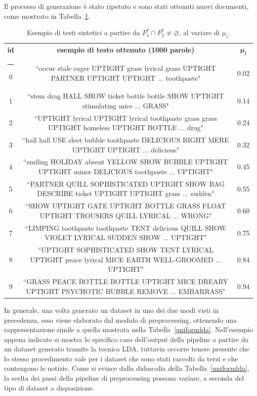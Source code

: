 \documentclass[12pt]{report}
\makeatletter
\theoremstyle{definition}
\newcommand{\thickhline}{%
    \noalign {\ifnum 0=`}\fi \hrule height 1pt
    \futurelet \reserved@a \@xhline
}
\let\emptyset\varnothing
\makeatother
\begin{document}
Il processo di generazione è stato ripetuto e sono stati ottenuti nuovi documenti, come mostrato in Tabella~\ref{generationexample2}.
\begin{table}
\centering
\begin{adjustbox}{max width=\textwidth}
 \begin{tabular}{|c|c|c|} 
 \hline
\textbf{id} & \textbf{esempio di testo ottenuto (1000 parole)} & $\bm{\mu_i}$ 
\\ [0.5ex] 
 \thickhline
0 & ``occur stale eager UPTIGHT grass lyrical grass UPTIGHT PARTNER UPTIGHT UPTIGHT ... toothpaste" & 0.02 \\
1 & ``stem drag HALL SHOW ticket bottle bottle SHOW UPTIGHT stimulating mice ... GRASS" & 0.14  \\
2 & ``UPTIGHT lyrical UPTIGHT lyrical toothpaste grass grass UPTIGHT homeless UPTIGHT BOTTLE ... drag" & 0.24 \\
3 & ``hall hall USE sleet bubble toothpaste DELICIOUS RIGHT MERE UPTIGHT UPTIGHT ... delicious" & 0.32 \\
4 & ``smiling HOLIDAY absent YELLOW SHOW BUBBLE UPTIGHT UPTIGHT minor DELICIOUS toothpaste ... UPTIGHT" & 0.45 \\
5 & ``PARTNER QUILL SOPHISTICATED UPTIGHT SHOW BAG DESCRIBE ticket UPTIGHT UPTIGHT grass ... sudden" & 0.55 \\
6 & ``SHOW UPTIGHT GATE UPTIGHT BOTTLE GRASS FLOAT UPTIGHT TROUSERS QUILL LYRICAL ... WRONG" & 0.60  \\
7 & ``LIMPING toothpaste toothpaste TENT delicious QUILL SHOW VIOLET LYRICAL SUDDEN SHOW ... UPTIGHT" & 0.75 \\
8 & ``UPTIGHT SOPHISTICATED SHOW TENT LYRICAL UPTIGHT peace lyrical MICE EARTH WELL-GROOMED ... UPTIGHT" & 0.84 \\
9 & ``GRASS PEACE BOTTLE BOTTLE UPTIGHT MICE DREARY UPTIGHT PSYCHOTIC BUBBLE REMOVE ... EMBARRASS" & 0.94 \\
 \hline
\end{tabular}
\end{adjustbox}
\caption{Esempio di testi sintetici a partire da $P_{1}^{*} \cap P_{2}^{*} \neq \emptyset$, al variare di $\mu_i$.}
\label{generationexample2}
\end{table}
In generale, una volta generato un dataset in uno dei due modi visti in precedenza, esso viene elaborato dal modulo di preprocessing,
ottenendo una rappresentazione simile a quella mostrata nella Tabella~\ref{uniformlda}.
Nell'esempio appena indicato si mostra lo specifico caso dell'output della pipeline a partire da un dataset generato tramite la tecnica LDA, tuttavia occorre tenere presente che lo stesso procedimento vale per i dataset che sono stati raccolti da terzi e che contengono le notizie. Come si evince dalla didascalia della Tabella~\ref{uniformlda}, la scelta dei passi della pipeline di preprocessing possono variare, a seconda del tipo di dataset a disposizione.
\end{document}
